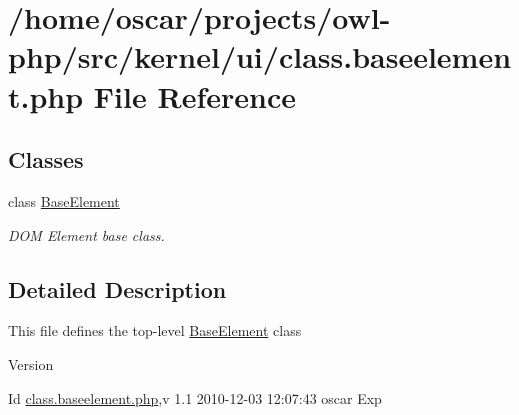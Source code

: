 \section{/home/oscar/projects/owl-\/php/src/kernel/ui/class.baseelement.php File Reference}
\label{class_8baseelement_8php}
\subsection*{Classes}
\begin{DoxyCompactItemize}
\item 
class \hyperlink{classBaseElement}{BaseElement}
\begin{DoxyCompactList}\small\item\em DOM Element base class. \item\end{DoxyCompactList}\end{DoxyCompactItemize}


\subsection{Detailed Description}
This file defines the top-\/level \hyperlink{classBaseElement}{BaseElement} class \begin{DoxyVersion}{Version}

\end{DoxyVersion}
\begin{DoxyParagraph}{Id}
\hyperlink{class_8baseelement_8php}{class.baseelement.php},v 1.1 2010-\/12-\/03 12:07:43 oscar Exp 
\end{DoxyParagraph}
